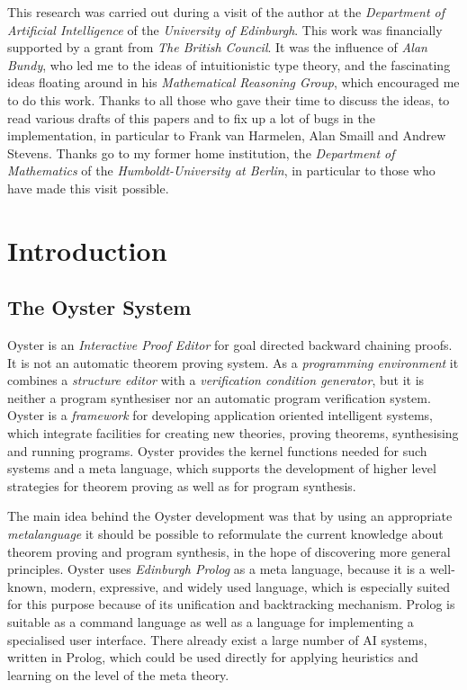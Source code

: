 \documentclass[11pt]{report}
\begin{document}
 This research was carried out during a visit of the author 
 at the \emph{Department of Artificial Intelligence} of the
 \emph{University of Edinburgh}. This work was financially supported
 by a grant from \emph{The British Council}. 
 It was the influence of \emph{Alan Bundy}, who led me to the ideas
 of intuitionistic type theory, and the fascinating ideas
 floating around in his \emph{Mathematical Reasoning Group}, 
 which encouraged me to do this work.
 Thanks to all those who gave their time to discuss the ideas,
 to read various drafts of this papers and to fix up a lot of
 bugs in the implementation, in particular to Frank van Harmelen,
 Alan Smaill and Andrew Stevens.  
 Thanks go to my former
 home institution, the \emph{Department of Mathematics} of the
 \emph{Humboldt-University at Berlin}, in particular to those who 
 have made this visit possible.
  
 \vspace{30ex}
 \newpage
 \pagestyle{fancy}
 \tableofcontents
  
 \chapter{Introduction}
 \section{The Oyster System}
   
 Oyster is an \emph{Interactive Proof Editor} for goal directed
 backward chaining proofs. It is not an automatic theorem proving
 system. As a \emph{programming environment} it 
 combines a \emph{structure editor} with a \emph{verification condition
 generator}, but it is neither a program synthesiser nor an automatic
 program verification system. Oyster is a \emph{framework} for
 developing application oriented intelligent systems, which integrate
 facilities for creating new theories, proving theorems, synthesising
 and running programs. Oyster provides the kernel functions needed
 for such systems and a meta language, which supports the 
 development of higher level strategies for theorem proving 
 as well as for program synthesis. 
  
 The main idea behind the Oyster development was that by using an 
 appropriate \emph{metalanguage} it should be possible 
 to reformulate the current knowledge about
 theorem proving and program synthesis, in the hope of 
 discovering more general principles.
 Oyster uses \emph{Edinburgh Prolog} as a meta language, because
 it is a well-known, modern, expressive, and widely used language,
 which is especially suited for this purpose because of its
 unification and backtracking mechanism.
 Prolog is suitable as a command language as well as a language
 for implementing a specialised user interface.
 There already exist a large number of AI systems, written in
 Prolog, which could be used directly for applying heuristics and 
 learning on the level of the meta theory.
  
\end{document}
